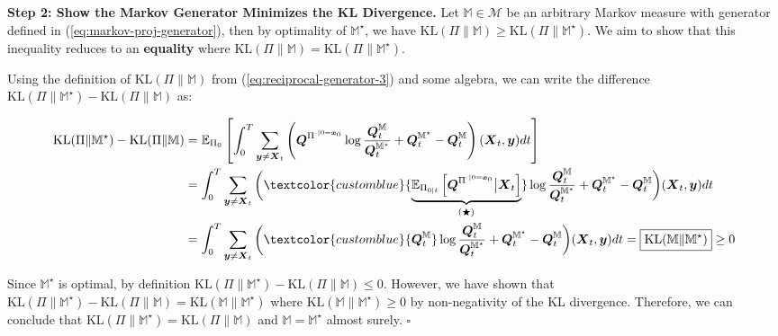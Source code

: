 \documentclass{article}
\newcommand{\bluetext}[1]{\textcolor{customblue}{#1}}
\begin{document}
\textbf{Step 2: Show the Markov Generator Minimizes the KL Divergence. }
Let $\mathbb{M}\in \mathcal{M}$ be an arbitrary Markov measure with generator defined in (\ref{eq:markov-proj-generator}), then by optimality of $\mathbb{M}^\star$, we have $\text{KL}(\Pi\|\mathbb{M})\geq\text{KL}(\Pi\|\mathbb{M}^\star)$. We aim to show that this inequality reduces to an \textbf{equality} where $\text{KL}(\Pi\|\mathbb{M})=\text{KL}(\Pi\|\mathbb{M}^\star)$.

Using the definition of $\text{KL}(\Pi\|\mathbb{M})$ from (\ref{eq:reciprocal-generator-3}) and some algebra, we can write the difference $\text{KL}(\Pi\|\mathbb{M}^\star)-\text{KL}(\Pi\|\mathbb{M})$ as:
\begin{small}
\begin{align}
\text{KL}(\Pi\|\mathbb{M}^\star)-\text{KL}(\Pi\|\mathbb{M})&=\mathbb{E}_{\Pi_0}\left[\int_0^T \sum_{\boldsymbol{y}\neq \boldsymbol{X}_t}\left(\boldsymbol{Q}^{\Pi^{\cdot|0=\boldsymbol{x}_0}}\log \frac{\boldsymbol{Q}_t^{\mathbb{M}}}{\boldsymbol{Q}_t^{\mathbb{M}^\star}}+\boldsymbol{Q}_t^{\mathbb{M}^\star}-\boldsymbol{Q}^{\mathbb{M}}_t\right)(\boldsymbol{X}_t,\boldsymbol{y})dt\right]\nonumber\\
&=\int_0^T \sum_{\boldsymbol{y}\neq \boldsymbol{X}_t}\bigg(\bluetext{\underbrace{\mathbb{E}_{\Pi_{0|t}}\left[\boldsymbol{Q}^{\Pi^{\cdot|0=\boldsymbol{x}_0}}\big|\boldsymbol{X}_t\right]}_{(\bigstar)}}\log \frac{\boldsymbol{Q}_t^{\mathbb{M}}}{\boldsymbol{Q}_t^{\mathbb{M}^\star}}+\boldsymbol{Q}_t^{\mathbb{M}^\star}-\boldsymbol{Q}^{\mathbb{M}}_t\bigg)(\boldsymbol{X}_t,\boldsymbol{y})dt\nonumber\\
&=\int_0^T \sum_{\boldsymbol{y}\neq \boldsymbol{X}_t}\bigg(\bluetext{\boldsymbol{Q}_t^{\mathbb{M}}}\log \frac{\boldsymbol{Q}_t^{\mathbb{M}}}{\boldsymbol{Q}_t^{\mathbb{M}^\star}}+\boldsymbol{Q}_t^{\mathbb{M}^\star}-\boldsymbol{Q}^{\mathbb{M}}_t\bigg)(\boldsymbol{X}_t,\boldsymbol{y})dt=\boxed{\text{KL}(\mathbb{M}\|\mathbb{M}^\star)}\geq 0
\end{align}
\end{small}
Since $\mathbb{M}^\star$ is optimal, by definition $\text{KL}(\Pi\|\mathbb{M}^\star)-\text{KL}(\Pi\|\mathbb{M})\leq 0$. However, we have shown that $\text{KL}(\Pi\|\mathbb{M}^\star)-\text{KL}(\Pi\|\mathbb{M})=\text{KL}(\mathbb{M}\|\mathbb{M}^\star)$ where $\text{KL}(\mathbb{M}\|\mathbb{M}^\star)\geq 0$ by non-negativity of the KL divergence. Therefore, we can conclude that $\text{KL}(\Pi\|\mathbb{M}^\star)=\text{KL}(\Pi\|\mathbb{M})$ and $\mathbb{M}=\mathbb{M}^\star$ almost surely. \hfill $\square$
\end{document}
